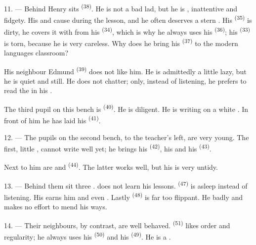 \VUsaut{4.2mm}
\VUsaut{3.2mm}

11. --- Behind Henry sits  \textsuperscript{(38)}. He is not a bad lad, but he
is , inattentive and fidgety. His  and
 cause  during the lesson, and he often deserves a
stern . His  \textsuperscript{(35)} is dirty, he covers it
with  from his  \textsuperscript{(34)}, which is why he always
uses his  \textsuperscript{(36)}; his
 \textsuperscript{(33)} is torn, because he is very careless. Why does he
bring his  \textsuperscript{(37)} to the modern languages classroom?

His neighbour Edmund \textsuperscript{(39)} does not like him. He is admittedly a little lazy,
but he is quiet and still. He does not chatter; only, instead of listening, he prefers to read
the  in his
.

The third pupil on this bench is  \textsuperscript{(40)}. He is diligent. He
is writing on a white . In front of him he has laid his
 \textsuperscript{(41)}.

12. --- The pupils on the second bench, to the teacher's left, are very young. The first,
little , cannot write well yet; he brings his
 \textsuperscript{(42)}, his  and his 
\textsuperscript{(43)}.

Next to him are  and  \textsuperscript{(44)}. The latter
works well, but his  is very untidy.

13. --- Behind them sit three .  does not learn his lessons.
 \textsuperscript{(47)} is asleep instead of listening. His
 earns him  and even .
Lastly  \textsuperscript{(48)} is far too flippant. He 
badly and makes no effort to mend his ways.

14. --- Their neighbours, by contrast, are well behaved. 
\textsuperscript{(51)} likes order and regularity; he always uses his 
\textsuperscript{(50)} and his  \textsuperscript{(49)}. He is a
.

